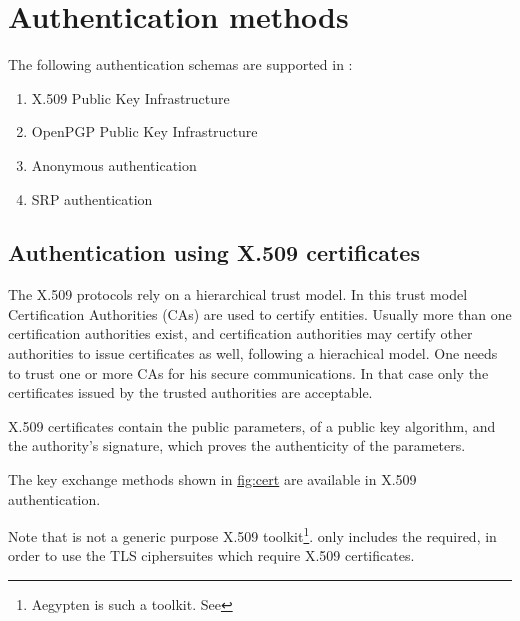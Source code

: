\section{Authentication methods}
\par
The following authentication schemas are supported in \gnutls:
\begin{enumerate}
 \item X.509 Public Key Infrastructure
 \item OpenPGP Public Key Infrastructure
 \item Anonymous authentication
 \item SRP authentication
\end{enumerate}

\subsection{Authentication using X.509 certificates}
The X.509 protocols rely on a hierarchical trust model. In this trust model
Certification Authorities (CAs) are used to certify entities.
Usually more than one certification authorities exist, and certification
authorities may certify other authorities to issue certificates as well,
following a hierachical model. 
One needs to trust one or more CAs for his secure
communications. In that case only the certificates issued by the trusted
authorities are acceptable. 
\par
X.509 certificates contain the public parameters, 
of a public key algorithm, and the authority's signature, which proves the
authenticity of the parameters.
\par
The key exchange methods shown in \hyperref{figure}{figure }{}{fig:cert} are
available in X.509 authentication. 

\par
Note that \gnutls{} is not a generic purpose X.509 toolkit\footnote{Aegypten is such a toolkit. See 
}. 
\gnutls{} only includes the required,
in order to use the TLS ciphersuites which require X.509 certificates.

